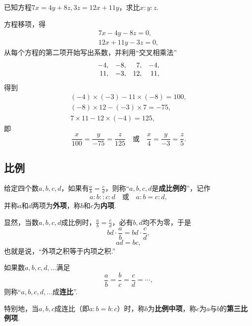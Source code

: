 \begin{example}
已知方程\(7x=4y+8z, 3z=12x+11y\)，求比\(x:y:z\).
\begin{solution}
方程移项，得\begin{gather*}
7x-4y-8z=0, \\
12x+11y-3z=0,
\end{gather*}
从每个方程的第二项开始写出系数，并利用“交叉相乘法”
\[
\begin{array}{*4r}
-4, & -8, & 7, & -4, \\
11, & -3, & 12, & 11,
\end{array}
\]得到\begin{gather*}
(-4)\times(-3)-11\times(-8)=100, \\
(-8)\times12-(-3)\times7=-75, \\
7\times11-12\times(-4)=125,
\end{gather*}即\[
\frac{x}{100}=\frac{y}{-75}=\frac{z}{125}
\quad\text{或}\quad
\frac{x}{4}=\frac{y}{-3}=\frac{z}{5}.
\]
\end{solution}
\end{example}

\subsection{比例}
\begin{definition}
给定四个数\(a,b,c,d\)，如果有\(\frac{a}{b}=\frac{c}{d}\)，则称“\(a,b,c,d\)是\textbf{成比例的}”，记作\[
a:b :: c:d
\quad\text{或}\quad
a:b = c:d,
\]并称\(a\)和\(d\)两项为\textbf{外项}，称\(b\)和\(c\)为\textbf{内项}.
\end{definition}

显然，当数\(a,b,c,d\)成比例时，\(\frac{a}{b}=\frac{c}{d}\)，必有\(b,d\)均不为零，于是\[
bd \cdot \frac{a}{b} = bd \cdot \frac{c}{d},
\]\[
ad = bc,
\]也就是说，“外项之积等于内项之积.”

\begin{definition}
如果数\(a,b,c,d,\dotsc\)满足\[
\frac{a}{b} = \frac{b}{c} = \frac{c}{d} = \dotsb,
\]则称“\(a,b,c,d,\dotsc\)成\textbf{连比}”.

特别地，当\(a,b,c\)成连比（即\(a:b = b:c\)）时，称\(b\)为\textbf{比例中项}，称\(c\)为\(a\)与\(b\)的\textbf{第三比例项}.
\end{definition}

